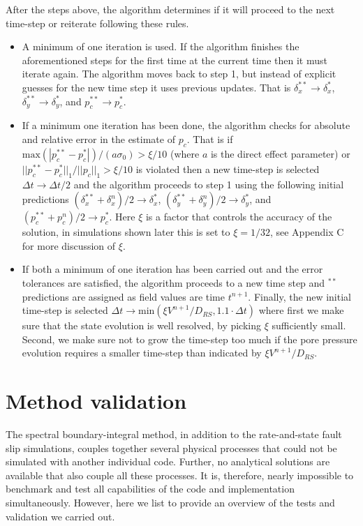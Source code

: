 \documentclass[draft]{agujournal2019}
\begin{document}
After the steps above, the algorithm determines if it will proceed to the next time-step or reiterate following these rules.

\begin{itemize}

    \item A minimum of one iteration is used. If the algorithm finishes the aforementioned steps for the first time at the current time then it must iterate again. The algorithm moves back to step 1, but instead of explicit guesses for the new time step it uses previous updates. That is $\delta_x^{**} \rightarrow \delta_x^{*}$, $\delta_y^{**} \rightarrow \delta_y^{*}$, and $p_c^{**} \rightarrow p_c^{*}$.
    \item If a minimum one iteration has been done, the algorithm checks for absolute and relative error in the estimate of $p_c$. That is if $\text{max} (|p_c^{**} - p_c^*|)/(a \sigma_0) > \xi/10$ (where $a$ is the direct effect parameter)  or $||p_c^{**} - p_c^*||_1/||p_c||_1 > \xi/10$ is violated then a new time-step is selected $\Delta t \rightarrow \Delta t /2$ and the algorithm proceeds to step 1 using the following initial predictions $(\delta_x^{**} + \delta_x^{n})/2 \rightarrow \delta_x^{*}$, $(\delta_y^{**} + \delta_y^{n})/2 \rightarrow \delta_y^{*}$, and $(p_c^{**} + p_c^n)/2 \rightarrow p_c^{*}$. Here $\xi$ is a factor that controls the accuracy of the solution, in simulations shown later this is set to $\xi = 1/32$, see Appendix C for more discussion of $\xi$.
    \item If both a minimum of one iteration has been carried out and the error tolerances are satisfied, the algorithm proceeds to a new time step and $^{**}$ predictions are assigned as field values are time $t^{n+1}$. Finally, the new initial time-step is selected $\Delta t \rightarrow \text{min} (\xi V^{n+1}/D_{RS} , 1.1 \cdot \Delta t )$ where first we make sure that the state evolution is well resolved, by picking $\xi$ sufficiently small. Second, we make sure not to grow the time-step too much if the pore pressure evolution requires a smaller time-step than indicated by $\xi V^{n+1}/D_{RS}$.
\end{itemize}

\section{Method validation}

The spectral boundary-integral method, in addition to the rate-and-state fault slip simulations, couples together several physical processes that could not be simulated with another individual code. Further, no analytical solutions are available that also couple all these processes. It is, therefore, nearly impossible to benchmark and test all capabilities of the code and implementation simultaneously. However, here we list to provide an overview of the tests and validation we carried out.
\end{document}
